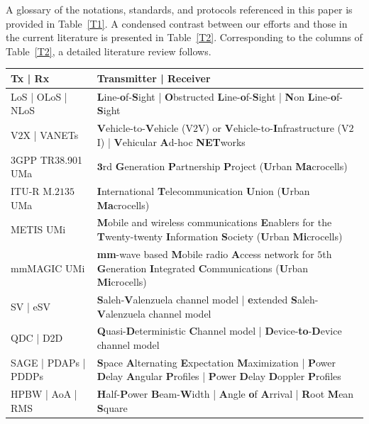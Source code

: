 \documentclass[12pt, draftcls, onecolumn]{IEEEtran}
\begin{document}
A glossary of the notations, standards, and protocols referenced in this paper is provided in Table~\ref{T1}. A condensed contrast between our efforts and those in the current literature is presented in Table~\ref{T2}. Corresponding to the columns of Table~\ref{T2}, a detailed literature review follows.
\begin{table} [tb]
	\centering
	\scriptsize
	\begin{tabular}{|l||l|}
		\hline
        Tx | Rx & Transmitter | Receiver\\
        \hline
        LoS | OLoS | NLoS & \textbf{L}ine-\textbf{o}f-\textbf{S}ight | \textbf{O}bstructed \textbf{L}ine-\textbf{o}f-\textbf{S}ight | \textbf{N}on \textbf{L}ine-\textbf{o}f-\textbf{S}ight\\
        \hline
		V$2$X | VANETs & \textbf{V}ehicle-to-\textbf{V}ehicle (V$2$V) or \textbf{V}ehicle-to-\textbf{I}nfrastructure (V$2$I) | \textbf{V}ehicular \textbf{A}d-hoc \textbf{NET}works\\
		\hline
		$3$GPP TR38.901 UMa & $\mathbf{3}$rd \textbf{G}eneration \textbf{P}artnership \textbf{P}roject (\textbf{U}rban \textbf{Ma}crocells)\\
		\hline
		ITU-R M$.2135$ UMa & \textbf{I}nternational \textbf{T}elecommunication \textbf{U}nion (\textbf{U}rban \textbf{Ma}crocells)\\
		\hline
        METIS UMi & \textbf{M}obile and wireless communications \textbf{E}nablers for the \textbf{T}wenty-twenty \textbf{I}nformation \textbf{S}ociety (\textbf{U}rban \textbf{Mi}crocells)\\
        \hline
        mmMAGIC UMi & \textbf{mm}-wave based \textbf{M}obile radio \textbf{A}ccess network for $5$th \textbf{G}eneration \textbf{I}ntegrated \textbf{C}ommunications (\textbf{U}rban \textbf{Mi}crocells)\\
        \hline
        SV | eSV & \textbf{S}aleh-\textbf{V}alenzuela channel model | \textbf{e}xtended \textbf{S}aleh-\textbf{V}alenzuela channel model\\
        \hline
        QDC | D2D  & \textbf{Q}uasi-\textbf{D}eterministic \textbf{C}hannel model | \textbf{D}evice-\textbf{to}-\textbf{D}evice channel model\\
        \hline
		SAGE | PDAPs | PDDPs & \textbf{S}pace \textbf{A}lternating \textbf{E}xpectation \textbf{M}aximization | \textbf{P}ower \textbf{D}elay \textbf{A}ngular \textbf{P}rofiles | \textbf{P}ower \textbf{D}elay \textbf{D}oppler \textbf{P}rofiles\\
		\hline
		HPBW | AoA | RMS & \textbf{H}alf-\textbf{P}ower \textbf{B}eam-\textbf{W}idth | \textbf{A}ngle \textbf{o}f \textbf{A}rrival | \textbf{R}oot \textbf{M}ean \textbf{S}quare\\

\end{tabular}
\end{table}
\end{document}

